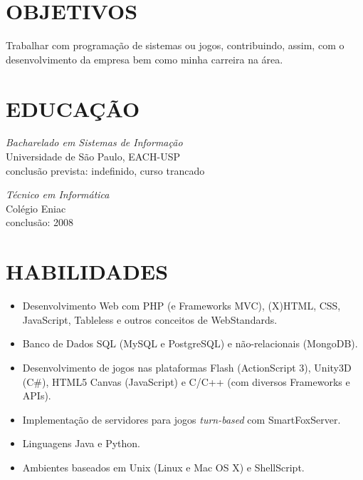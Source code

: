 \documentclass[line,margin]{res}
\begin{document}

\address{Av. Sete de Setembro, 1256 - Guarulhos - São Paulo}
\address{(11) 99932-6440 - bruno@croci.me - \href{http://bruno.croci.me/}{http://bruno.croci.me/}}

 
\begin{resume}
 
\section{OBJETIVOS} Trabalhar com programação de sistemas ou jogos, contribuindo,
                 assim, com o desenvolvimento da empresa bem como minha carreira
                 na área.
 
 
\section{EDUCAÇÃO} {\sl Bacharelado em Sistemas de Informação} \\
                Universidade de São Paulo, EACH-USP \\
                conclusão prevista: indefinido, curso trancado
                
                {\sl Técnico em Informática} \\
                Colégio Eniac \\
                conclusão: 2008 \\
 
 
\section{HABILIDADES} \begin{itemize}  \itemsep -2pt
                 \item Desenvolvimento Web com PHP (e Frameworks MVC), (X)HTML, CSS, JavaScript, 
                       Tableless e outros conceitos de WebStandards.
                 \item Banco de Dados SQL (MySQL e PostgreSQL) e não-relacionais (MongoDB).
                 \item Desenvolvimento de jogos nas plataformas Flash (ActionScript 3), Unity3D (C\#),
                       HTML5 Canvas (JavaScript) e C/C++ (com diversos Frameworks e APIs).
                 \item Implementação de servidores para jogos {\sl turn-based} com SmartFoxServer.
                 \item Linguagens Java e Python.
                 \item Ambientes baseados em Unix (Linux e Mac OS X) e ShellScript.
                 \end{itemize}
 

\end{resume}
\end{document}

